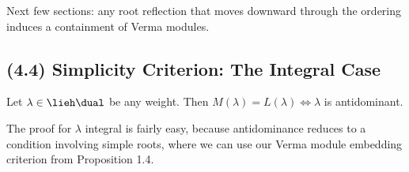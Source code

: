\begin{description}
\begin{center}
\end{center}
\end{description}

Next few sections: any root reflection that moves downward through the
ordering induces a containment of Verma modules.

\hypertarget{simplicity-criterion-the-integral-case}{%
\subsection{(4.4) Simplicity Criterion: The Integral
Case}\label{simplicity-criterion-the-integral-case}}

\begin{description}
\tightlist
\item[Theorem (Vermas Equal Quotients iff Antidominant Weight)]
Let \(\lambda \in \lieh\dual\) be any weight. Then
\(M(\lambda) = L(\lambda) \iff \lambda\) is antidominant.
\end{description}

The proof for \(\lambda\) integral is fairly easy, because antidominance
reduces to a condition involving simple roots, where we can use our
Verma module embedding criterion from Proposition 1.4.

